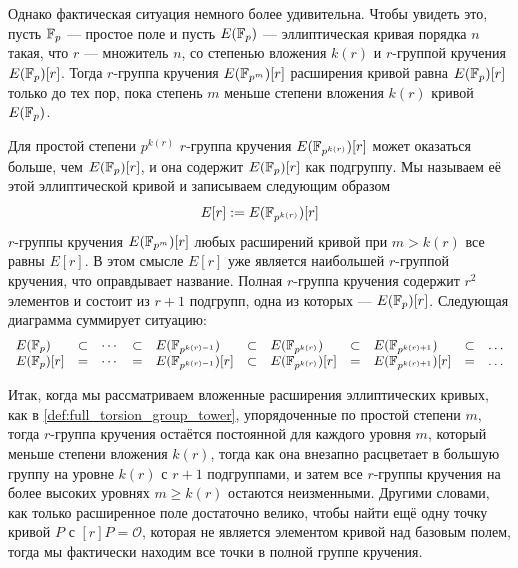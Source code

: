 Однако фактическая ситуация немного более удивительна. Чтобы увидеть это, пусть $\mathbb{F}_p$ — простое поле и пусть $E(\mathbb{F}_p)$ — эллиптическая кривая порядка $n$ такая, что $r$ — множитель $n$, со степенью вложения $k(r)$ и $r$-группой кручения $E(\mathbb{F}_p)[r]$. Тогда $r$-группа кручения $E(\mathbb{F}_{p^m})[r]$ расширения кривой равна $E(\mathbb{F}_p)[r]$ только до тех пор, пока степень $m$ меньше степени вложения $k(r)$ кривой $E(\mathbb{F}_p)$. 

Для простой степени $p^{k(r)}$ $r$-группа кручения $E(\mathbb{F}_{p^{k(r)}})[r]$ может оказаться больше, чем $E(\mathbb{F}_p)[r]$, и она содержит $E(\mathbb{F}_p)[r]$ как подгруппу. Мы называем её  этой эллиптической кривой и записываем следующим образом
\begin{equation}
\label{def:full_torsion_group}
E[r] := E(\mathbb{F}_{p^{k(r)}})[r]
\end{equation}
$r$-группы кручения $E(\mathbb{F}_{p^m})[r]$ любых расширений кривой при $m>k(r)$ все равны $E[r]$. В этом смысле $E[r]$ уже является наибольшей $r$-группой кручения, что оправдывает название. Полная $r$-группа кручения содержит $r^2$ элементов и состоит из $r+1$ подгрупп, одна из которых — $E(\mathbb{F}_{p})[r]$. Следующая диаграмма суммирует ситуацию:
\begin{equation}
\label{def:full_torsion_group_tower}
\begin{array}{lccclclclcl}
E(\mathbb{F}_{p}) & \subset & \cdots  & \subset & E(\mathbb{F}_{p^{k(r)-1}}) & \subset & E(\mathbb{F}_{p^{k(r)}}) & \subset & E(\mathbb{F}_{p^{k(r)+1}}) & \subset & \ldots\\
E(\mathbb{F}_{p})[r] & = & \cdots  & = & E(\mathbb{F}_{p^{k(r)-1}})[r] & \subset & E(\mathbb{F}_{p^{k(r)}})[r] & = & 
E(\mathbb{F}_{p^{k(r)+1}})[r] & = & \ldots
\end{array}
\end{equation}

Итак, когда мы рассматриваем вложенные расширения эллиптических кривых, как в \ref{def:full_torsion_group_tower}, упорядоченные по простой степени $m$, тогда $r$-группа кручения остаётся постоянной для каждого уровня $m$, который меньше степени вложения $k(r)$, тогда как она внезапно расцветает в большую группу на уровне $k(r)$ с $r+1$ подгруппами, и затем все $r$-группы кручения на более высоких уровнях $m\geq k(r)$ остаются неизменными. Другими словами, как только расширенное поле достаточно велико, чтобы найти ещё одну точку кривой $P$ с $[r]P=\mathcal{O}$, которая не является элементом кривой над базовым полем, тогда мы фактически находим все точки в полной группе кручения.

